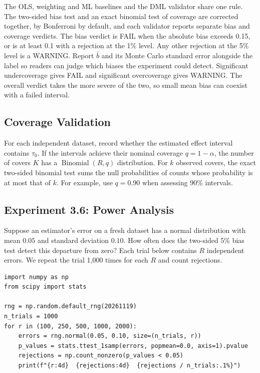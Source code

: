 The OLS, weighting and ML baselines and the DML validator share one rule.
The two-sided bias test and an exact binomial test of coverage are corrected
together, by Bonferroni by default, and each validator reports separate bias
and coverage verdicts. The bias verdict is FAIL when the absolute bias exceeds
0.15, or is at least 0.1 with a rejection at the 1\% level. Any other rejection
at the 5\% level is a WARNING. Report $\bar b$ and its Monte
Carlo standard error alongside the label so readers can judge which biases the
experiment could detect. Significant undercoverage gives FAIL and significant
overcoverage gives WARNING. The overall verdict takes the more severe of the two, so small mean bias can coexist with a failed interval.

\subsection{Coverage Validation}

For each independent dataset, record whether the estimated effect interval
contains $\tau_0$. If the intervals achieve their nominal coverage $q=1-\alpha$,
the number of covers $K$ has a $\operatorname{Binomial}(R,q)$ distribution.
For $k$ observed covers, the exact two-sided binomial test sums the null
probabilities of counts whose probability is at most that of $k$.
For example, use $q=0.90$ when assessing 90\% intervals.

\subsection{Experiment 3.6: Power Analysis}

Suppose an estimator's error on a fresh dataset has a normal distribution
with mean $0.05$ and standard deviation $0.10$. How often does the two-sided
5\% bias test detect this departure from zero? Each trial below contains $R$
independent errors. We repeat the trial 1,000 times for each $R$ and count
rejections.

\begin{verbatim}
import numpy as np
from scipy import stats

rng = np.random.default_rng(20261119)
n_trials = 1000
for r in (100, 250, 500, 1000, 2000):
    errors = rng.normal(0.05, 0.10, size=(n_trials, r))
    p_values = stats.ttest_1samp(errors, popmean=0.0, axis=1).pvalue
    rejections = np.count_nonzero(p_values < 0.05)
    print(f"{r:4d}  {rejections:4d}  {rejections / n_trials:.1%}")
\end{verbatim}

